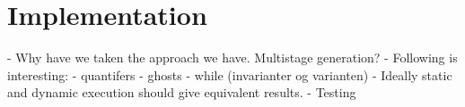 \section{Implementation}

- Why have we taken the approach we have. Multistage generation?
- Following is interesting:
  - quantifers
  - ghosts
  - while (invarianter og varianten)
- Ideally static and dynamic execution should give equivalent results.
- Testing
